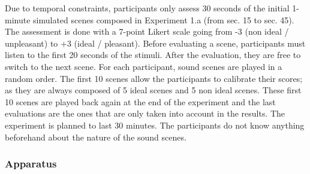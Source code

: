 \documentclass[preprint,12pt]{elsarticle}
\begin{document}
%
%
%

Due to temporal constraints, participants only assess 30 seconds of the initial 1-minute simulated scenes composed in Experiment 1.a (from sec. 15 to sec. 45).
The assessment is done with a 7-point Likert scale going from -3 (non ideal / unpleasant) to +3 (ideal / pleasant). Before evaluating a scene, participants must listen to the first 20 seconds of the stimuli. After the evaluation, they are free to switch to the next scene.
For each participant, sound scenes are played in a random order. The first 10 scenes allow the participants to calibrate their scores; as they are always composed of 5 ideal scenes and 5 non ideal scenes. These first 10 scenes are played back again at the end of the experiment and the last evaluations are the ones that are only taken into account in the results.
The experiment is planned to last 30 minutes. The participants do not know anything beforehand about the nature of the sound scenes.

\subsubsection*{Apparatus}

%
%
\end{document}
